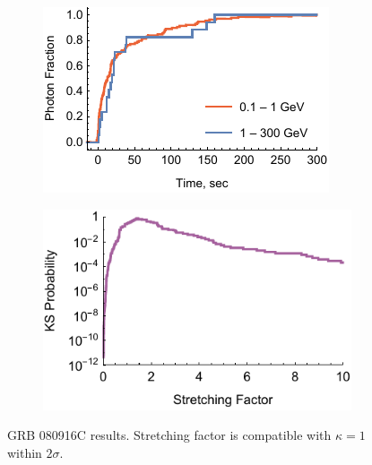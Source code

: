 \documentclass{article}
\begin{document}
\begin{figure}
        \centering
        \begin{subfigure}{0.49\textwidth}
                \includegraphics[width=\textwidth]{lightCurve080916C}
                \label{fig:lightCurve080916C}
        \end{subfigure}
        \begin{subfigure}{0.49\textwidth}
                \includegraphics[width=\textwidth]{probabilities080916C}
                \label{fig:probabilities080916C}
        \end{subfigure}
        \caption{GRB 080916C results. Stretching factor is compatible with $\kappa = 1$ within $2\sigma$.}
        \label{fig:grb080916C}
\end{figure}
\end{document}
